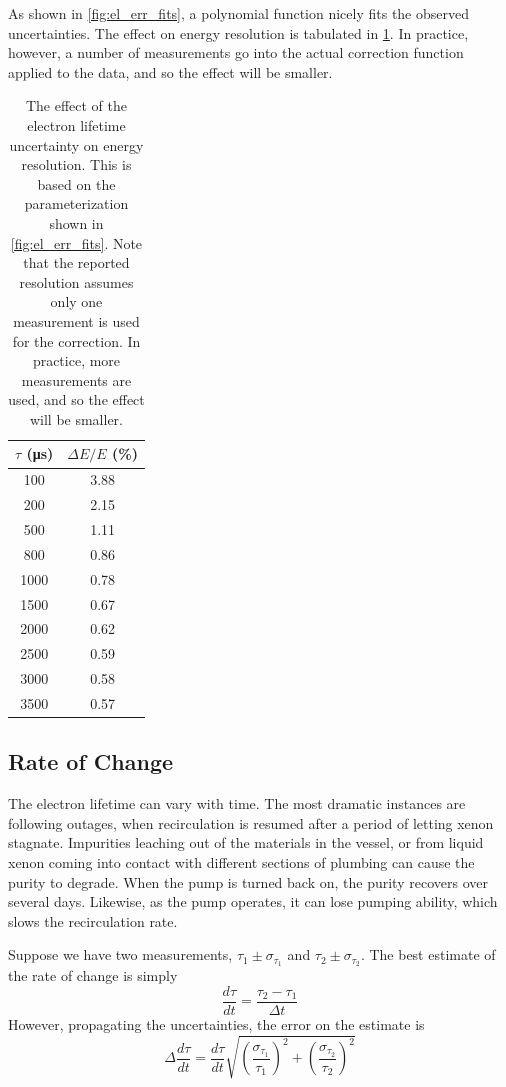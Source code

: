 \documentclass[herrin-thesis.tex]{subfiles}
\begin{document}
As shown in \cref{fig:el_err_fits}, a polynomial function nicely fits the observed uncertainties. The effect on energy resolution is tabulated in \cref{tab:el_res_dtau}. In practice, however, a number of measurements go into the actual correction function applied to the data, and so the effect will be smaller.

\begin{table}[htd]
\centering
\caption[Electron lifetime uncertainty effect on resolution]{The effect of the electron lifetime uncertainty on energy resolution. This is based on the parameterization shown in \cref{fig:el_err_fits}. Note that the reported resolution assumes only one measurement is used for the correction. In practice, more measurements are used, and so the effect will be smaller.}
\label{tab:el_res_dtau}
\begin{tabular}{c|c}
	\(\tau\) (\si{\micro\second})	&	\(\Delta E / E\) (\%) 	\\ \hline
	100					&	3.88				\\
	200					&	2.15				\\
	500					&	1.11				\\
	800					&	0.86				\\
	1000					&	0.78				\\
	1500					&	0.67				\\
	2000					&	0.62				\\
	2500					&	0.59				\\
	3000					&	0.58				\\
	3500					&	0.57
\end{tabular}
\end{table}

\subsection{Rate of Change}
The electron lifetime can vary with time. The most dramatic instances are following outages, when recirculation is resumed after a period of letting xenon stagnate. Impurities leaching out of the materials in the vessel, or from liquid xenon coming into contact with different sections of plumbing can cause the purity to degrade. When the pump is turned back on, the purity recovers over several days. Likewise, as the pump operates, it can lose pumping ability, which slows the recirculation rate.

Suppose we have two measurements, \(\tau_1 \pm \sigma_{\tau_1}\) and \(\tau_2 \pm \sigma_{\tau_2}\). The best estimate of the rate of change is simply
\[\frac{d\tau}{dt} = \frac{\tau_2 - \tau_1}{\Delta t}\]
However, propagating the uncertainties, the error on the estimate is
\[\Delta \frac{d\tau}{dt} = \frac{d\tau}{dt}\sqrt{\left(\frac{\sigma_{\tau_1}}{\tau_1}\right)^2 + \left(\frac{\sigma_{\tau_2}}{\tau_2}\right)^2}\]
\end{document}
